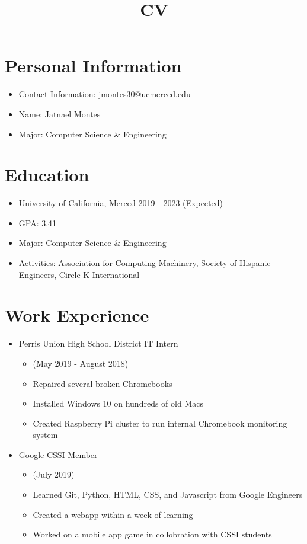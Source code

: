 \documentclass{article}
\title{CV}
\date{}
\begin{document}
\maketitle

\section*{Personal Information}
\begin{itemize}
    \item Contact Information: jmontes30@ucmerced.edu 
    \item Name: Jatnael Montes 
    \item Major: Computer Science & Engineering 
\end{itemize}



\section*{Education}
\begin{itemize}
    \item University of California, Merced 2019 - 2023 (Expected) 
    \item GPA: 3.41
    \item Major: Computer Science & Engineering
    \item Activities: Association for Computing Machinery, Society of Hispanic Engineers, Circle K International
\end{itemize}

\section*{Work Experience}
\begin{itemize}
   \item Perris Union High School District IT Intern 
   \begin{itemize}
       \item (May 2019 - August 2018)
       \item Repaired several broken Chromebooks
       \item Installed Windows 10 on hundreds of old Macs
       \item Created Raspberry Pi cluster to run internal Chromebook monitoring system
   \end{itemize}
   \item Google CSSI Member
   \begin{itemize}
       \item (July 2019)
       \item Learned Git, Python, HTML, CSS, and Javascript from Google Engineers 
       \item Created a webapp within a week of learning 
       \item Worked on a mobile app game in collobration with CSSI students
   \end{itemize}
   
\end{itemize}
\end{document}
